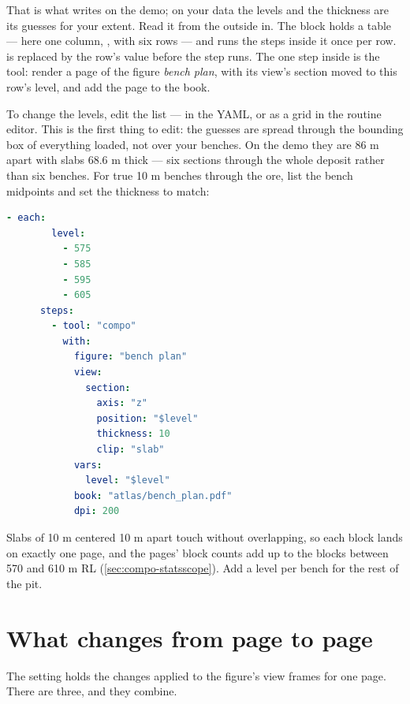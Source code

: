 That is what  writes on the demo; on your data the levels and the thickness are its guesses for your extent. Read it from the outside in. The  block holds a table — here one column, , with six rows — and runs the steps inside it once per row.  is replaced by the row's value before the step runs. The one step inside is the  tool: render a page of the figure \emph{bench plan}, with its view's section moved to this row's level, and add the page to the book.

To change the levels, edit the list — in the YAML, or as a grid in the routine editor. This is the first thing to edit: the guesses are spread through the bounding box of everything loaded, not over your benches. On the demo they are 86 m apart with slabs 68.6 m thick — six sections through the whole deposit rather than six benches. For true 10 m benches through the ore, list the bench midpoints and set the thickness to match:

\begin{lstlisting}[language=yaml]
    - each:
        level:
          - 575
          - 585
          - 595
          - 605
      steps:
        - tool: "compo"
          with:
            figure: "bench plan"
            view:
              section:
                axis: "z"
                position: "$level"
                thickness: 10
                clip: "slab"
            vars:
              level: "$level"
            book: "atlas/bench_plan.pdf"
            dpi: 200
\end{lstlisting}

Slabs of 10 m centered 10 m apart touch without overlapping, so each block lands on exactly one page, and the pages' block counts add up to the blocks between 570 and 610 m RL (\cref{sec:compo-statsscope}). Add a level per bench for the rest of the pit.

\section{What changes from page to page}\label{sec:atlas-view}

The  setting holds the changes applied to the figure's view frames for one page. There are three, and they combine.

